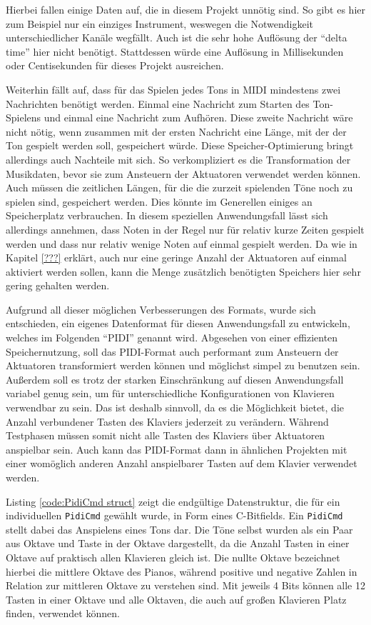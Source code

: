Hierbei fallen einige Daten auf, die in diesem Projekt unnötig sind.
So gibt es hier zum Beispiel nur ein einziges Instrument, weswegen die Notwendigkeit unterschiedlicher Kanäle wegfällt.
Auch ist die sehr hohe Auflösung der \enquote{delta time} hier nicht benötigt.
Stattdessen würde eine Auflösung in Millisekunden oder Centisekunden für dieses Projekt ausreichen.

Weiterhin fällt auf, dass für das Spielen jedes Tons in \ac{MIDI} mindestens zwei Nachrichten benötigt werden.
Einmal eine Nachricht zum Starten des Ton-Spielens und einmal eine Nachricht zum Aufhören.
Diese zweite Nachricht wäre nicht nötig, wenn zusammen mit der ersten Nachricht eine Länge, mit der der Ton gespielt werden soll, gespeichert würde.
Diese Speicher-Optimierung bringt allerdings auch Nachteile mit sich.
So verkompliziert es die Transformation der Musikdaten, bevor sie zum Ansteuern der Aktuatoren verwendet werden können.
Auch müssen die zeitlichen Längen, für die die zurzeit spielenden Töne noch zu spielen sind, gespeichert werden.
Dies könnte im Generellen einiges an Speicherplatz verbrauchen.
In diesem speziellen Anwendungsfall lässt sich allerdings annehmen, dass Noten in der Regel nur für relativ kurze Zeiten gespielt werden und dass nur relativ wenige Noten auf einmal gespielt werden.
Da wie in Kapitel \ref{???} erklärt, auch nur eine geringe Anzahl der Aktuatoren auf einmal aktiviert werden sollen, kann die Menge zusätzlich benötigten Speichers hier sehr gering gehalten werden.

Aufgrund all dieser möglichen Verbesserungen des Formats, wurde sich entschieden, ein eigenes Datenformat für diesen Anwendungsfall zu entwickeln, welches im Folgenden \enquote{\ac{PIDI}} genannt wird.
Abgesehen von einer effizienten Speichernutzung, soll das \ac{PIDI}-Format auch performant zum Ansteuern der Aktuatoren transformiert werden können und möglichst simpel zu benutzen sein.
Außerdem soll es trotz der starken Einschränkung auf diesen Anwendungsfall variabel genug sein, um für unterschiedliche Konfigurationen von Klavieren verwendbar zu sein.
Das ist deshalb sinnvoll, da es die Möglichkeit bietet, die Anzahl verbundener Tasten des Klaviers jederzeit zu verändern.
Während Testphasen müssen somit nicht alle Tasten des Klaviers über Aktuatoren anspielbar sein.
Auch kann das \ac{PIDI}-Format dann in ähnlichen Projekten mit einer womöglich anderen Anzahl anspielbarer Tasten auf dem Klavier verwendet werden.

Listing \ref{code:PidiCmd struct} zeigt die endgültige Datenstruktur, die für ein individuellen \lstinline{PidiCmd} gewählt wurde, in Form eines C-Bitfields.
Ein \lstinline{PidiCmd} stellt dabei das Anspielens eines Tons dar.
Die Töne selbst wurden als ein Paar aus Oktave und Taste in der Oktave dargestellt, da die Anzahl Tasten in einer Oktave auf praktisch allen Klavieren gleich ist.
Die nullte Oktave bezeichnet hierbei die mittlere Oktave des Pianos, während positive und negative Zahlen in Relation zur mittleren Oktave zu verstehen sind.
Mit jeweils 4 Bits können alle 12 Tasten in einer Oktave und alle Oktaven, die auch auf großen Klavieren Platz finden, verwendet können.

